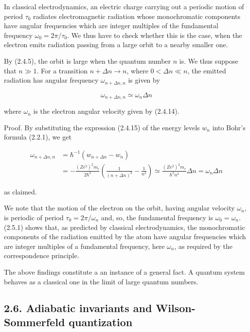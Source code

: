\documentclass{article}
\begin{document}
In classical electrodynamics, an electric charge carrying out a periodic motion of period $\tau_{0}$ radiates electromagnetic radiation whose monochromatic components have angular frequencies which are integer multiples of the fundamental frequency $\omega_{0}=2 \pi / \tau_{0}$. We thus have to check whether this is the case, when the electron emits radiation passing from a large orbit to a nearby smaller one.

By (2.4.5), the orbit is large when the quantum number $n$ is. We thus suppose that $n \gg 1$. For a transition $n+\Delta n \rightarrow n$, where $0<\Delta n \ll n$, the emitted radiation has angular frequency $\omega_{n+\Delta n, n}$ is given by
 
\begin{equation*}
\omega_{n+\Delta n, n} \simeq \omega_{n} \Delta n \tag{2.5.1}
\end{equation*}
 
where $\omega_{n}$ is the electron angular velocity given by (2.4.14).

Proof. By substituting the expression (2.4.15) of the energy levels $w_{n}$ into Bohr's formula (2.2.1), we get
 
\begin{align*}
\omega_{n+\Delta n, n} & =\hbar^{-1}\left(w_{n+\Delta n}-w_{n}\right)  \tag{2.5.2}\\
& =-\frac{\left(Z e^{2}\right)^{2} m_{r}}{2 \hbar^{3}}\left(\frac{1}{(n+\Delta n)^{2}}-\frac{1}{n^{2}}\right) \simeq \frac{\left(Z e^{2}\right)^{2} m_{r}}{\hbar^{3} n^{3}} \Delta n=\omega_{n} \Delta n
\end{align*}
 
as claimed.

We note that the motion of the electron on the orbit, having angular velocity $\omega_{n}$, is periodic of period $\tau_{0}=2 \pi / \omega_{n}$ and, so, the fundamental frequency is $\omega_{0}=\omega_{n}$. (2.5.1) shows that, as predicted by classical electrodynamics, the monochromatic components of the radiation emitted by the atom have angular frequencies which are integer multiples of a fundamental frequency, here $\omega_{n}$, as required by the correspondence principle.

The above findings constitute a an instance of a general fact.
A quantum system behaves as a classical one in the limit of large quantum numbers.

\subsection*{2.6. Adiabatic invariants and Wilson-Sommerfeld quantization}
\end{document}
